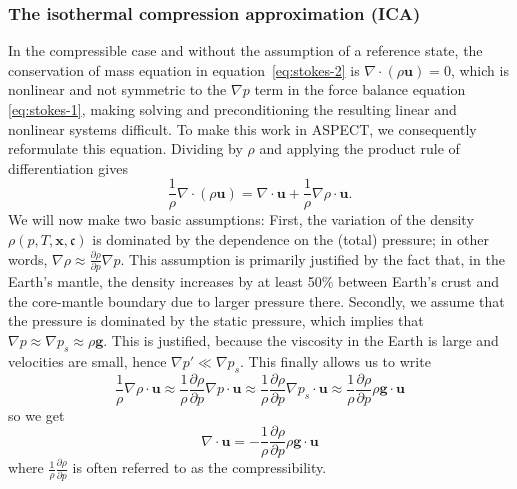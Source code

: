 \documentclass{article}
\newcommand{\aspect}{\textsc{ASPECT}}
\begin{document}
\subsubsection{The isothermal compression approximation (ICA)}
\label{sec:ica}

In the compressible case and without the assumption of a reference state, 
the conservation of mass equation in equation~\eqref{eq:stokes-2} is $\nabla 
\cdot \left( \rho \textbf{u} \right)= 0$, which is nonlinear and not symmetric to the $\nabla p$ term in the
force balance equation \eqref{eq:stokes-1}, making solving and preconditioning
the resulting linear and nonlinear systems difficult. To make this work in
\aspect{}, we consequently reformulate this equation. Dividing by $\rho$ and
applying the product rule of differentiation gives
\begin{equation*}
\frac{1}{\rho} \nabla \cdot \left( \rho \textbf{u} \right) = \nabla \cdot \textbf{u} + \frac{1}{\rho} \nabla \rho \cdot  \textbf{u}.
\end{equation*}
We will now make two basic assumptions: First, the variation of the density
$\rho(p,T,\mathbf x, \mathfrak c)$ is dominated by the dependence on the
(total) pressure; in other words, $\nabla \rho \approx \frac{\partial \rho}{\partial
  p}\nabla p$. This assumption is primarily justified by the fact that, in the
Earth's mantle, the density increases by at least 50\% between Earth's crust and
the core-mantle boundary due to larger pressure there. Secondly, we assume
that the pressure is dominated by the static pressure, which implies that
$\nabla p \approx \nabla p_s \approx \rho \textbf{g}$. This is justified, 
because the viscosity in the Earth is large and velocities are small, 
hence $\nabla p' \ll \nabla p_s$.
This finally allows us to write
\begin{equation*}
\frac{1}{\rho} \nabla \rho \cdot \textbf{u} \approx \frac{1}{\rho} \frac{\partial \rho}{\partial p} \nabla p \cdot \textbf{u} \approx \frac{1}{\rho} \frac{\partial \rho}{\partial p} \nabla p_s \cdot \textbf{u} \approx \frac{1}{\rho} \frac{\partial \rho}{\partial p} \rho \textbf{g} \cdot \textbf{u} 
\end{equation*}
so we get
\begin{equation}
\label{eq:stokes-2-compressible}
\nabla \cdot \textbf{u} = -\frac{1}{\rho} \frac{\partial \rho}{\partial p} \rho \textbf{g} \cdot \textbf{u}
\end{equation}
where $\frac{1}{\rho} \frac{\partial \rho}{\partial p}$ is often referred to
as the compressibility.
\end{document}
